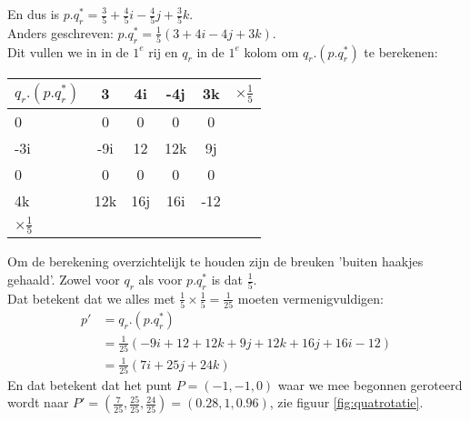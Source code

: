 \documentclass[hidelinks, a4wide, 12pt,  twoside]{book}
\begin{document}
En dus is $ p.q^*_r = \frac{3}{5}  + \frac{4}{5}i - \frac{4}{5}j  + \frac{3}{5}k. $
\\Anders geschreven:  $ p.q^*_r = \frac{1}{5}  (3 + 4i - 4j  + 3k). $ 
\\Dit vullen we  in in de $ 1^e $ rij en $ q_r $ in de $ 1^e  $ kolom om $ q_r.(p.q^*_r) $ te berekenen:\\
\begin{center}
	\begin{tabular}{ | l || c | c |c |c |l}
		\hline
		$ q_r.(p.q^*_r) $  & 3 & 4i   & -4j & 3k &  $ \times  \frac{1}{5} $\\ \hline \hline
		0                         & 0    & 0    & 0       & 0 & \\ \hline
		-3i                      & -9i   & 12  & 12k    & 9j & \\ \hline
		0                         & 0    &  0   & 0       & 0&\\ \hline
		4k                       & 12k & 16j  & 16i   & -12 & \\ 
		\hline 
		$ \times  \frac{1}{5} $
	\end{tabular}
\end{center}
Om de berekening overzichtelijk te houden zijn de breuken 'buiten haakjes gehaald'. Zowel voor $ q_r $ als voor $ p.q^*_r $ is dat $  \frac{1}{5}. $ 
\\Dat betekent dat we alles met $  \frac{1}{5} \times  \frac{1}{5}  =  \frac{1}{25} $ moeten vermenigvuldigen: 
\begin{align*}
p' &=  q_r.(p.q^*_r)  \\
&=  \frac{1}{25}(-9i + 12 +12k + 9j + 12k + 16j + 16i -  12)  \\
& = \frac{1}{25} (7i + 25j +  24k  )
\end{align*}
En dat betekent dat het punt $ P=(-1,-1,0)  $ waar we mee begonnen  geroteerd wordt naar $ P'=  (\frac{7}{25}, \frac{25}{25}, \frac{24}{25}) =(0.28,1,0.96)  $, zie  figuur \ref{fig:quatrotatie}.

\end{document}
